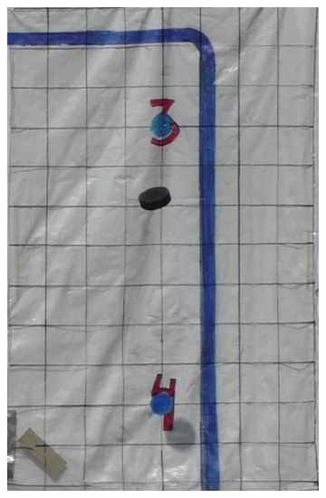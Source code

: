 \documentclass[a4paper,12pt]{report}
\begin{document}
\begin{figure}[ht]
\begin{subfigure}[t]{0.24\textwidth}
    \includegraphics[width=\linewidth]{photos/skott2.png}
  \end{subfigure}%
  \hspace*{\fill}
  \begin{subfigure}[t]{0.24\textwidth}
    \centering

\end{subfigure}
\end{figure}
\end{document}
